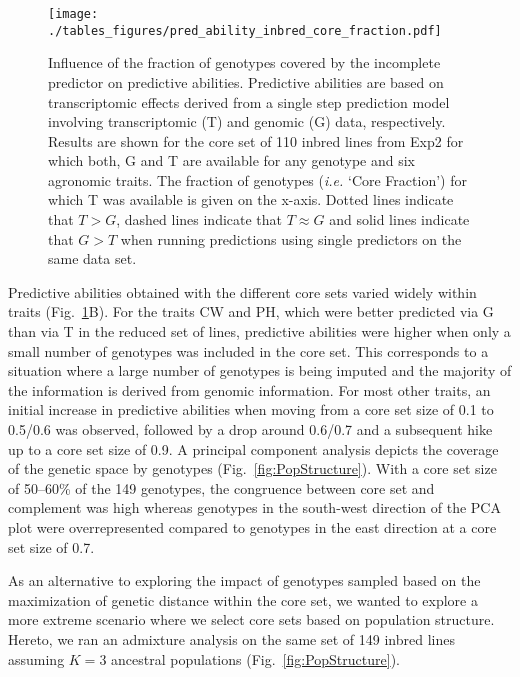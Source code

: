 \documentclass[12pt,titlepage]{article}
\begin{document}
\begin{figure}[H]
  \centering
  \texttt{[image: ./tables\_figures/pred\_ability\_inbred\_core\_fraction.pdf]}
  \caption{
  Influence of the fraction of genotypes covered by the incomplete predictor
  on predictive abilities.
  Predictive abilities are based on transcriptomic effects derived from a
  single step prediction model involving transcriptomic (T) and genomic (G)
  data, respectively.
  Results are shown for the core set of 110 inbred lines from Exp2 for which
  both, G and T are available for any genotype and six agronomic traits.
  The fraction of genotypes (\textit{i.e.} `Core Fraction') for which
  T was available is given on the x-axis.
  Dotted lines indicate that $T > G$, dashed lines indicate that $T \approx G$
  and solid lines indicate that $G > T$ when running predictions using single
  predictors on the same data set.
  }
\label{fig:InbredResults}
\end{figure}




Predictive abilities obtained with the different core sets varied widely within
traits (Fig.~\ref{fig:InbredResults}B).
For the traits CW and PH, which were better predicted via G than via T in the 
reduced set of lines, predictive abilities were higher when only a small number 
of genotypes was included in the core set.
This corresponds to a situation where a large number of genotypes is being 
imputed and the majority of the information is derived from genomic information. 
For most other traits, an initial increase in predictive abilities when moving
from a core set size of 0.1 to 0.5/0.6 was observed, followed by a drop around
0.6/0.7 and a subsequent hike up to a core set size of 0.9.
A principal component analysis depicts the coverage of the genetic space by
genotypes (Fig.~\ref{fig:PopStructure}).
With a core set size of 50--60\% of the 149 genotypes, the congruence between
core set and complement was high whereas genotypes in the south-west direction
of the PCA plot were overrepresented compared to genotypes in the east 
direction at a core set size of 0.7.

As an alternative to exploring the impact of genotypes sampled based on the
maximization of genetic distance within the core set, we wanted to explore a
more extreme scenario where we select core sets based on population structure.
Hereto, we ran an admixture analysis on the same set of 149 inbred lines 
assuming $K=3$ ancestral populations (Fig.~\ref{fig:PopStructure}).
\end{document}
